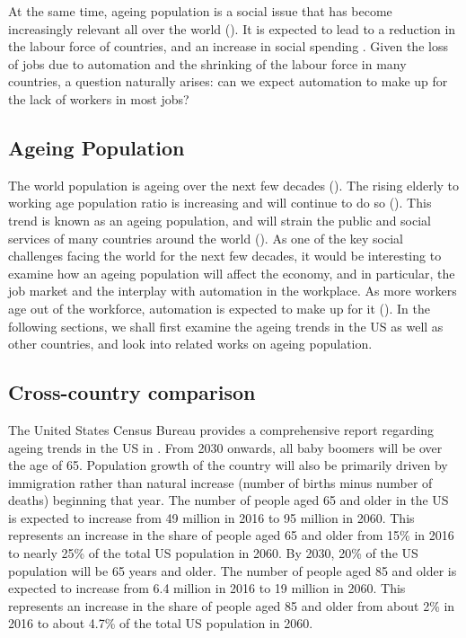 \documentclass[11pt]{article}
\begin{document}
At the same time, ageing population is a social issue that has become increasingly relevant all over the world (\cite{2002Wpa1}). It is expected to lead to a reduction in the labour force of countries, and an increase in social spending \cite{marevsova2015economics}. Given the loss of jobs due to automation and the shrinking of the labour force in many countries, a question naturally arises: can we expect automation to make up for the lack of workers in most jobs?

\subsection{Ageing Population}
\label{subsec:ageingpopulation}

The world population is ageing over the next few decades (\cite{science}). The rising elderly to working age population ratio is increasing and will continue to do so (\cite{WHO}). This trend is known as an ageing population, and will strain the public and social services of many countries around the world (\cite{publicservicesstrain}). As one of the key social challenges facing the world for the next few decades, it would be interesting to examine how an ageing population will affect the economy, and in particular, the job market and the interplay with automation in the workplace. As more workers age out of the workforce, automation is expected to make up for it (\cite{futureofemployment}). In the following sections, we shall first examine the ageing trends in the US as well as other countries, and look into related works on ageing population.

\subsection*{Cross-country comparison}
\label{subsec:crosscountrycomparison}

The United States Census Bureau provides a comprehensive report regarding ageing trends in the US in \cite{vespa2018demographic}. From 2030 onwards, all baby boomers will be over the age of 65. Population growth of the country will also be primarily driven by immigration rather than natural increase (number of births minus number of deaths) beginning that year. The number of people aged 65 and older in the US is expected to increase from 49 million in 2016 to 95 million in 2060. This represents an increase in the share of people aged 65 and older from 15\% in 2016 to nearly 25\% of the total US population in 2060. By 2030, 20\% of the US population will be 65 years and older. The number of people aged 85 and older is expected to increase from 6.4 million in 2016 to 19 million in 2060. This represents an increase in the share of people aged 85 and older from about 2\% in 2016 to about 4.7\% of the total US population in 2060.
\end{document}
